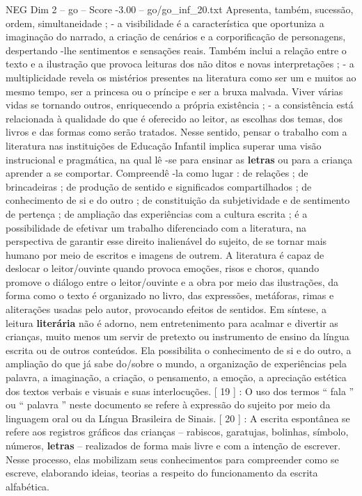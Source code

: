 \begin{textsample}{NEG Dim 2 – go – Score -3.00 – go/go\_inf\_20.txt}
Apresenta, também, sucessão, ordem, simultaneidade ; - a visibilidade é a característica que oportuniza a imaginação do narrado, a criação de cenários e a corporificação de personagens, despertando -lhe sentimentos e sensações reais.
Também inclui a relação entre o texto e a ilustração que provoca leituras dos não ditos e novas interpretações ; - a multiplicidade revela os mistérios presentes na literatura como ser um e muitos ao mesmo tempo, ser a princesa ou o príncipe e ser a bruxa malvada.
Viver várias vidas se tornando outros, enriquecendo a própria existência ; - a consistência está relacionada à qualidade do que é oferecido ao leitor, as escolhas dos temas, dos livros e das formas como serão tratados.
Nesse sentido, pensar o trabalho com a literatura nas instituições de Educação Infantil implica superar uma visão instrucional e pragmática, na qual lê -se para ensinar as \textbf{letras} ou para a criança aprender a se comportar.
Compreendê -la como lugar : de relações ; de brincadeiras ; de produção de sentido e significados compartilhados ; de conhecimento de si e do outro ; de constituição da subjetividade e de sentimento de pertença ; de ampliação das experiências com a cultura escrita ; é a possibilidade de efetivar um trabalho diferenciado com a literatura, na perspectiva de garantir esse direito inalienável do sujeito, de se tornar mais humano por meio de escritos e imagens de outrem.
A literatura é capaz de deslocar o leitor/ouvinte quando provoca emoções, risos e choros, quando promove o diálogo entre o leitor/ouvinte e a obra por meio das ilustrações, da forma como o texto é organizado no livro, das expressões, metáforas, rimas e aliterações usadas pelo autor, provocando efeitos de sentidos.
Em síntese, a leitura \textbf{literária} não é adorno, nem entretenimento para acalmar e divertir as crianças, muito menos um servir de pretexto ou instrumento de ensino da língua escrita ou de outros conteúdos.
Ela possibilita o conhecimento de si e do outro, a ampliação do que já sabe do/sobre o mundo, a organização de experiências pela palavra, a imaginação, a criação, o pensamento, a emoção, a apreciação estética dos textos verbais e visuais e suas interlocuções. [ 19 ] : O uso dos termos “ fala ” ou “ palavra ” neste documento se refere à expressão do sujeito por meio da linguagem oral ou da Língua Brasileira de Sinais. [ 20 ] : A escrita espontânea se refere aos registros gráficos das crianças – rabiscos, garatujas, bolinhas, símbolo, números, \textbf{letras} – realizados de forma mais livre e com a intenção de escrever.
Nesse processo, elas mobilizam seus conhecimentos para compreender como se escreve, elaborando ideias, teorias a respeito do funcionamento da escrita alfabética.

\end{textsample}
